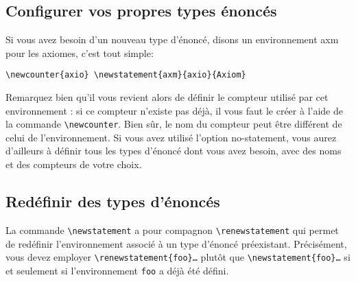 \documentclass[french,ColorTheme=USAF,FontSize=10pt]{tango}
\newcommand\TO[1]{\textsf{#1}}
\begin{document}
\subsection{Configurer vos propres types énoncés}
Si vous avez besoin d'un nouveau type d'énoncé, disons un environnement \TO{axm} pour les axiomes, c'est tout simple:
\begin{tcolorbox}
\begin{verbatim}
\newcounter{axio} \newstatement{axm}{axio}{Axiom}
\end{verbatim}
\end{tcolorbox}
Remarquez bien qu'il vous revient alors de définir  le compteur utilisé par cet environnement : si ce compteur n'existe pas déjà, il vous faut le créer à l'aide de la commande \verb+\newcounter+. Bien sûr, le nom du compteur peut être différent de celui de l'environnement. Si vous avez utilisé l'option \TO{no-statement}, vous aurez d'ailleurs à définir tous les types d'énoncé dont vous avez besoin, avec des noms et des compteurs de votre choix.

\subsection{Redéfinir des types d'énoncés}
La commande \verb+\newstatement+ a pour compagnon \verb+\renewstatement+ qui permet de redéfinir l'environnement associé à un type d'énoncé préexistant. Précisément, vous devez employer \verb+\renewstatement{foo}…+ plutôt que \verb+\newstatement{foo}…+ si et seulement si l'environnement \verb+foo+ a déjà été défini.
\end{document}
